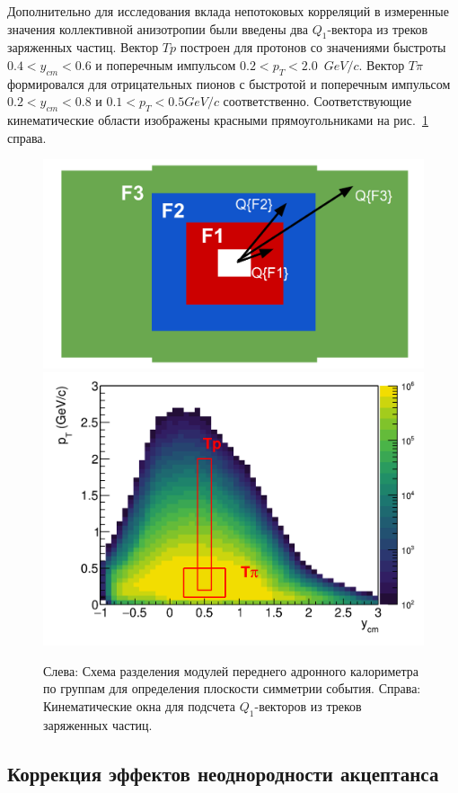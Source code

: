 Дополнительно для исследования вклада непотоковых корреляций в измеренные значения коллективной анизотропии были введены два $Q_1$-вектора из треков заряженных частиц. 
Вектор $Tp$ построен для протонов со значениями быстроты $0.4<y_{cm}<0.6$ и поперечным импульсом $0.2<p_{T}<2.0$~$GeV/c$.
Вектор $T\pi$ формировался для отрицательных пионов с быстротой и поперечным импульсом $0.2<y_{cm}<0.8$ и $0.1<p_T<0.5 GeV/c$ соответственно.
Соответствующие кинематические области изображены красными прямоугольниками на рис.~\ref{fig:bmn_subevents} справа.
%
\begin{figure}[ht]
\begin{center}
\includegraphics[width=0.45\linewidth]{images/FHCal_layout.png}
\includegraphics[width=0.45\linewidth]{images/pT_ycm_protons.png}
\caption{
Слева: Схема разделения модулей переднего адронного калориметра по группам для определения плоскости симметрии события.
Справа: Кинематические окна для подсчета $Q_1$-векторов из треков заряженных частиц.
}
\label{fig:bmn_subevents}
\end{center}
\end{figure}

\subsection{Коррекция эффектов неоднородности акцептанса}

